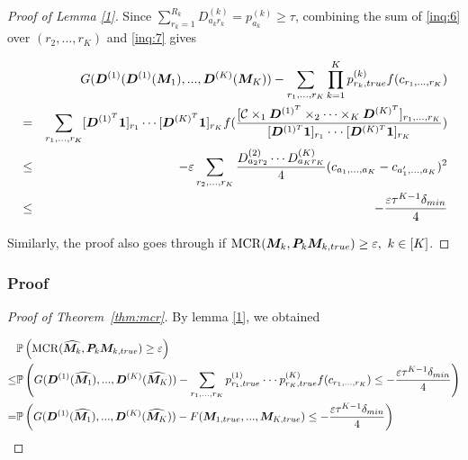 \documentclass{article}
\DeclareMathOperator*{\mcr}{MCR}
\begin{document}
\begin{appendices}
\begin{proof}[Proof of Lemma \ref{1}]
Since $\displaystyle\sum_{r_k=1}^{R_k}D_{a_kr_k}^{(k)}=p_{a_k}^{(k)}\geq \tau$, combining the sum of \eqref{inq:6} over $(r_2,...,r_K)$ and \eqref{inq:7} gives

\begin{eqnarray*}
&&G(\boldsymbol{D}^{(1)}(\boldsymbol{D}^{(1)}(\boldsymbol{M}_1),...,\boldsymbol{D}^{(K)}(\boldsymbol{M}_K))-\displaystyle\sum_{r_1,...,r_K}\prod_{k=1}^Kp_{r_k,true}^{(k)}f(c_{r_1,...,r_K})\\
&=&\displaystyle\sum_{r_1,...,r_K}[\boldsymbol{D}^{(1)^T}\boldsymbol{1}]_{r_1}\cdots [\boldsymbol{D}^{(K)^T}\boldsymbol{1}]_{r_K}f(\frac{[\mathcal{C}\times_1 \boldsymbol{D}^{(1)^T}\times_2\cdots \times_K \boldsymbol{D}^{(K)^T}]_{r_1,...,r_K}}{[\boldsymbol{D}^{(1)^T}\boldsymbol{1}]_{r_1}\cdot\cdot\cdot [\boldsymbol{D}^{(K)^T}\boldsymbol{1}]_{r_K}})\\
&\leq& -\varepsilon\displaystyle\sum_{r_2,...,r_K}\frac{D_{a_2r_2}^{(2)}\cdots D_{a_Kr_K}^{(K)}}{4}(c_{a_1,...,a_K}-c_{a_1',...,a_K})^2\\
&\leq& -\frac{\varepsilon\tau^{K-1}\delta_{min}}{4}
\end{eqnarray*}

Similarly, the proof also goes through if $\mcr(\mM_k, \mP_k\mM_{k,true})\geq \varepsilon,~k\in[K]$.
\end{proof}

\subsubsection{Proof}
\begin{proof}[Proof of Theorem~\ref{thm:mcr}]
By lemma \ref{1}, we obtained 

\begin{equation}\label{inq:1}
\begin{split}
    &\mathbb{P}\left(\mcr(\widehat{\mM_k}, \mP_k\mM_{k,true})\geq \varepsilon\right)\\
    \leq& \mathbb{P}\left( G(\mD^{(1)}(\widehat{\mM_1}),...,\mD^{(K)}(\widehat{\mM_K}))-\displaystyle\sum_{r_1,...,r_K}p_{r_1,true}^{(1)}\cdot\cdot\cdot p_{r_K,true}^{(K)}f(c_{r_1,...,r_K})\leq -\frac{\varepsilon\tau^{K-1}\delta_{min}}{4}\right)\\
    =& \mathbb{P}\left(G(\mD^{(1)}(\widehat{\mM_1}),...,\mD^{(K)}(\widehat{\mM_K}))-F(\mM_{1,true},...,\mM_{K,true})\leq -\frac{\varepsilon\tau^{K-1}\delta_{min}}{4}\right)
\end{split}
\end{equation}



\end{proof}
\end{appendices}
\end{document}
